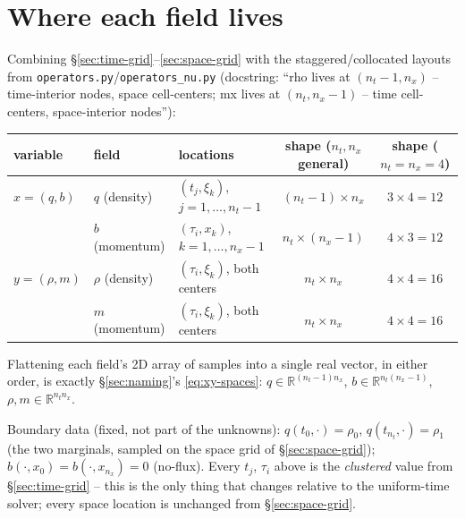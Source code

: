 \documentclass[11pt]{article}
\newcommand{\code}[1]{\texttt{#1}}
\begin{document}
\section{Where each field lives}
\label{sec:fields}

Combining \S\ref{sec:time-grid}--\ref{sec:space-grid} with the staggered/collocated
layouts from \code{operators.py}/\code{operators\_nu.py} (docstring: ``rho lives at
$(n_t{-}1,n_x)$ -- time-interior nodes, space cell-centers; mx lives at $(n_t,n_x{-}1)$ --
time cell-centers, space-interior nodes''):

\begin{center}
\begin{tabular}{lllcc}
\toprule
variable & field & locations & shape ($n_t,n_x$ general) & shape ($n_t{=}n_x{=}4$) \\
\midrule
$x=(q,b)$ & $q$ (density) & $(t_j,\xi_k)$, $j=1,\ldots,n_t{-}1$ & $(n_t{-}1)\times n_x$ & $3\times4=12$ \\
               & $b$ (momentum) & $(\tau_i,x_k)$, $k=1,\ldots,n_x{-}1$ & $n_t\times(n_x{-}1)$ & $4\times3=12$ \\
\midrule
$y=(\rho,m)$   & $\rho$ (density) & $(\tau_i,\xi_k)$, both centers & $n_t\times n_x$ & $4\times4=16$ \\
               & $m$ (momentum)   & $(\tau_i,\xi_k)$, both centers & $n_t\times n_x$ & $4\times4=16$ \\
\bottomrule
\end{tabular}
\end{center}

Flattening each field's 2D array of samples into a single real vector, in either order, is
exactly \S\ref{sec:naming}'s \eqref{eq:xy-spaces}: $q\in\mathbb{R}^{(n_t-1)n_x}$,
$b\in\mathbb{R}^{n_t(n_x-1)}$, $\rho,m\in\mathbb{R}^{n_t n_x}$.

Boundary data (fixed, not part of the unknowns): $q(t_0,\cdot)=\rho_0$,
$q(t_{n_t},\cdot)=\rho_1$ (the two marginals, sampled on the space grid of
\S\ref{sec:space-grid}); $b(\cdot,x_0)=b(\cdot,x_{n_x})=0$ (no-flux). Every $t_j$,
$\tau_i$ above is the \emph{clustered} value from \S\ref{sec:time-grid} -- this is the
only thing that changes relative to the uniform-time solver; every space location is
unchanged from \S\ref{sec:space-grid}.

\end{document}
